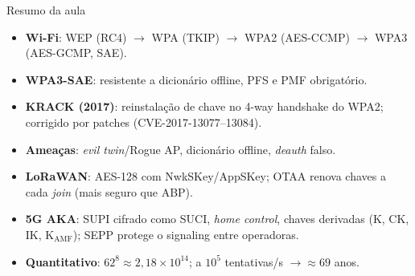 \documentclass[aspectratio=169,11pt]{beamer}
\begin{document}
\begin{frame}{Resumo da aula}
  \begin{itemize}
    \item \textbf{Wi-Fi}: WEP (RC4) $\rightarrow$ WPA (TKIP) $\rightarrow$ WPA2 (AES-CCMP) $\rightarrow$ WPA3 (AES-GCMP, SAE).
    \item \textbf{WPA3-SAE}: resistente a dicionário offline, PFS e PMF obrigatório.
    \item \textbf{KRACK (2017)}: reinstalação de chave no 4-way handshake do WPA2; corrigido por patches (CVE-2017-13077--13084).
    \item \textbf{Ameaças}: \emph{evil twin}/Rogue AP, dicionário offline, \emph{deauth} falso.
    \item \textbf{LoRaWAN}: AES-128 com NwkSKey/AppSKey; OTAA renova chaves a cada \emph{join} (mais seguro que ABP).
    \item \textbf{5G AKA}: SUPI cifrado como SUCI, \emph{home control}, chaves derivadas (K, CK, IK, K$_{\text{AMF}}$); SEPP protege o signaling entre operadoras.
    \item \textbf{Quantitativo}: $62^8 \approx 2{,}18 \times 10^{14}$; a $10^5$ tentativas/s $\rightarrow \approx 69$ anos.
  \end{itemize}
\end{frame}
\end{document}
